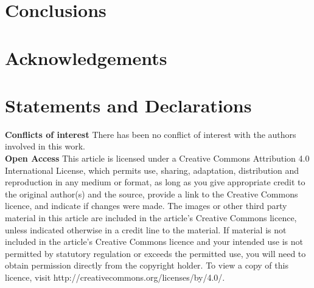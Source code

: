 \documentclass[default,iicol]{sn-jnl}
\begin{document}
\section{Conclusions}

\section{Acknowledgements}

\section{Statements and Declarations}
\small
\noindent\textbf{Conflicts of interest} There has been no conflict of interest with the
authors involved in this work. \\

\noindent\textbf{Open Access} This article is licensed under a Creative Commons Attribution 4.0 International License, which permits use, sharing, adaptation, distribution and reproduction in any medium or format, as long
as you give appropriate credit to the original author(s) and the source,
provide a link to the Creative Commons licence, and indicate if changes
were made. The images or other third party material in this article are
included in the article's Creative Commons licence, unless indicated
otherwise in a credit line to the material. If material is not included in
the article's Creative Commons licence and your intended use is not
permitted by statutory regulation or exceeds the permitted use, you will
need to obtain permission directly from the copyright holder. To view a
copy of this licence, visit http://creativecommons.org/licenses/by/4.0/.



\end{document}

